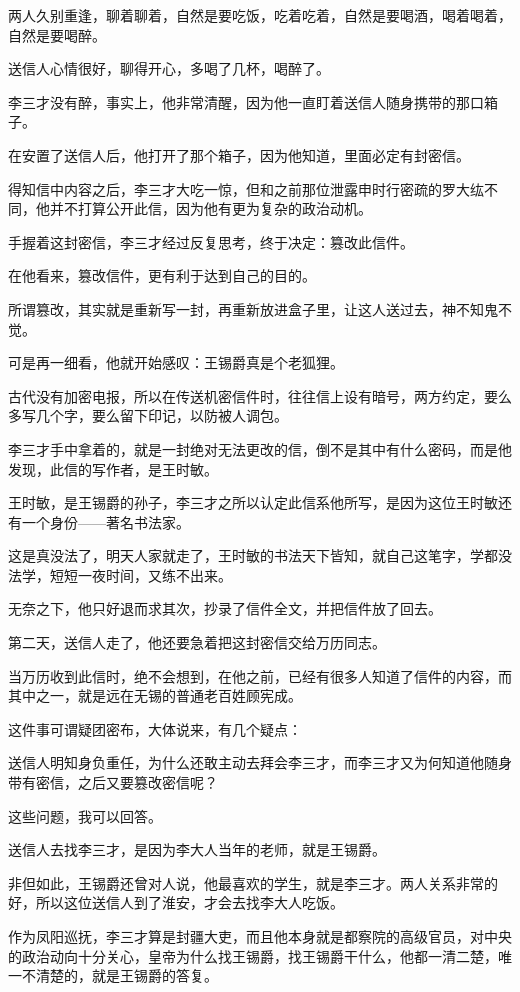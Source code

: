 \begin{multicols}{\theparacolNo}
两人久别重逢，聊着聊着，自然是要吃饭，吃着吃着，自然是要喝酒，喝着喝着，自然是要喝醉。

送信人心情很好，聊得开心，多喝了几杯，喝醉了。

李三才没有醉，事实上，他非常清醒，因为他一直盯着送信人随身携带的那口箱子。

在安置了送信人后，他打开了那个箱子，因为他知道，里面必定有封密信。

得知信中内容之后，李三才大吃一惊，但和之前那位泄露申时行密疏的罗大纮不同，他并不打算公开此信，因为他有更为复杂的政治动机。

手握着这封密信，李三才经过反复思考，终于决定：篡改此信件。

在他看来，篡改信件，更有利于达到自己的目的。

所谓篡改，其实就是重新写一封，再重新放进盒子里，让这人送过去，神不知鬼不觉。

可是再一细看，他就开始感叹：王锡爵真是个老狐狸。

古代没有加密电报，所以在传送机密信件时，往往信上设有暗号，两方约定，要么多写几个字，要么留下印记，以防被人调包。

李三才手中拿着的，就是一封绝对无法更改的信，倒不是其中有什么密码，而是他发现，此信的写作者，是王时敏。

王时敏，是王锡爵的孙子，李三才之所以认定此信系他所写，是因为这位王时敏还有一个身份——著名书法家。

这是真没法了，明天人家就走了，王时敏的书法天下皆知，就自己这笔字，学都没法学，短短一夜时间，又练不出来。

无奈之下，他只好退而求其次，抄录了信件全文，并把信件放了回去。

第二天，送信人走了，他还要急着把这封密信交给万历同志。

当万历收到此信时，绝不会想到，在他之前，已经有很多人知道了信件的内容，而其中之一，就是远在无锡的普通老百姓顾宪成。

这件事可谓疑团密布，大体说来，有几个疑点：

送信人明知身负重任，为什么还敢主动去拜会李三才，而李三才又为何知道他随身带有密信，之后又要篡改密信呢？

这些问题，我可以回答。

送信人去找李三才，是因为李大人当年的老师，就是王锡爵。

非但如此，王锡爵还曾对人说，他最喜欢的学生，就是李三才。两人关系非常的好，所以这位送信人到了淮安，才会去找李大人吃饭。

作为凤阳巡抚，李三才算是封疆大吏，而且他本身就是都察院的高级官员，对中央的政治动向十分关心，皇帝为什么找王锡爵，找王锡爵干什么，他都一清二楚，唯一不清楚的，就是王锡爵的答复。


\end{multicols}
